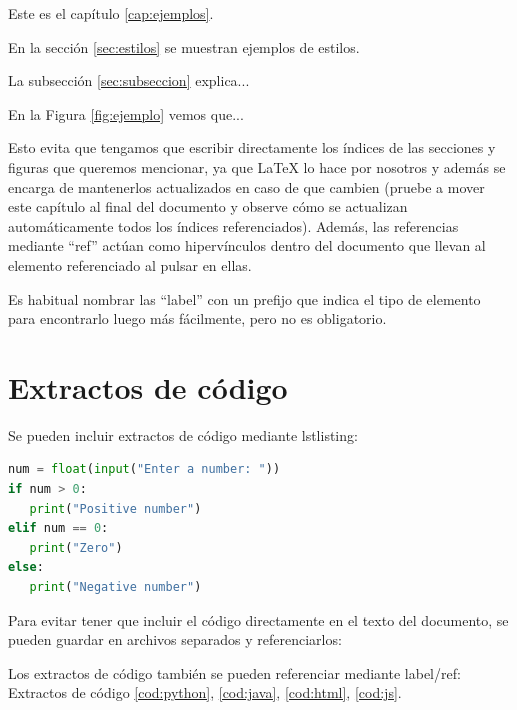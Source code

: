Este es el capítulo \ref{cap:ejemplos}.

En la sección \ref{sec:estilos} se muestran ejemplos de estilos.

La subsección \ref{sec:subseccion} explica...

En la Figura \ref{fig:ejemplo} vemos que...

Esto evita que tengamos que escribir directamente los índices de las secciones y figuras que queremos mencionar, ya que LaTeX lo hace por nosotros y además se encarga de mantenerlos actualizados en caso de que cambien (pruebe a mover este capítulo al final del documento y observe cómo se actualizan automáticamente todos los índices referenciados). Además, las referencias mediante ``ref'' actúan como hipervínculos dentro del documento que llevan al elemento referenciado al pulsar en ellas.

Es habitual nombrar las ``label'' con un prefijo que indica el tipo de elemento para encontrarlo luego más fácilmente, pero no es obligatorio.

\section{Extractos de código}

Se pueden incluir extractos de código mediante lstlisting:

\begin{lstlisting}[language=Python, caption={Código Python}, label={cod:python}, captionpos=b]
num = float(input("Enter a number: "))
if num > 0:
   print("Positive number")
elif num == 0:
   print("Zero")
else:
   print("Negative number")
\end{lstlisting}

Para evitar tener que incluir el código directamente en el texto del documento, se pueden guardar en archivos separados y referenciarlos:







Los extractos de código también se pueden referenciar mediante label/ref: Extractos de código \ref{cod:python}, \ref{cod:java}, \ref{cod:html}, \ref{cod:js}. 

